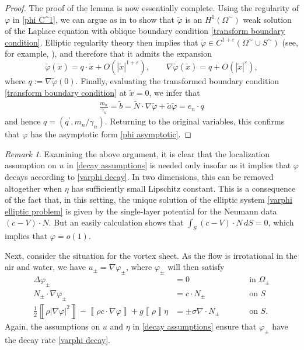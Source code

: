 \documentclass[11pt,reqno]{amsart}
\newcommand{\jump}[1]{\left\llbracket{#1}\right\rrbracket}
\newcommand{\grad}{\nabla}
\theoremstyle{plain}
\theoremstyle{remark}
\newtheorem{remark}[theorem]{Remark}
\numberwithin{equation}{section}
\begin{document}
\begin{proof}
The proof of the lemma is now essentially complete.  Using the regularity of $\varphi$ in \eqref{phi C^1}, we can argue as in \cite[Appendix A]{wheeler2016integral} to show that $\tilde \varphi$ is an $H^1(\Omega^\sim)$ weak solution of the Laplace equation with oblique boundary condition \eqref{transform boundary condition}.  Elliptic regularity theory then implies that $\tilde{\varphi} \in C^{1+\varepsilon}(\Omega^\sim \cup S^\sim)$ (see, for example, \cite[Theorem 5.51]{lieberman2013oblique}), and therefore that it admits the expansion 
\[ 
  \tilde \varphi(\tilde x) = q \cdot \tilde x + O(|\tilde x|^{1+\varepsilon}),
  \qquad 
  \nabla \tilde \varphi(\tilde x) = q + O(|\tilde x|^\varepsilon),
  \]
where $q := \nabla \tilde \varphi(0)$.  Finally, evaluating the transformed boundary condition \eqref{transform boundary condition} at $\tilde x = 0$, we infer that 
  \begin{align*}
    \frac{m_n}{\gamma_n}
    =
    \tilde b
    =
    \tilde N \cdot \grad \tilde\varphi  + \tilde a \tilde \varphi
    = e_n \cdot q
  \end{align*}
  and hence $q = (q^\prime, m_n/\gamma_n)$.  Returning to the original variables, this confirms that $\varphi$ has the asymptotic form \eqref{phi asymptotic}.
\end{proof}

\begin{remark} \label{decay of phi remark} Examining the above argument, it is clear that the localization assumption on $u$ in \eqref{decay assumptions} is needed only insofar as it implies that $\varphi$ decays according to \eqref{varphi decay}.  In two dimensions, this can be removed altogether when $\eta$ has sufficiently small Lipschitz constant.  This is a consequence of the fact that, in this setting, the unique solution of the elliptic system \eqref{varphi elliptic problem} is given by the single-layer potential for the Neumann data $(c-V) \cdot N$.
But an easily calculation shows that $\int_S (c-V) \cdot N\, dS = 0$, which implies that $\varphi=o(1)$. 
\end{remark}

Next, consider the situation for the vortex sheet.  As the flow is irrotational in the air and water, we have $u_\pm = \nabla \varphi_\pm$, where $\varphi_\pm$  will then satisfy
  \begin{subequations} \label{vortex sheet governing equations} 
\begin{alignat}{2}
 \Delta \varphi_\pm &= 0 && \qquad \textrm{in } \Omega_\pm  \label{vortex sheet varphi harmonic} \\
 N_\pm \cdot \nabla \varphi_\pm & = c \cdot N_\pm && \qquad \textrm{on } S \label{vortex sheet kinematic condition} \\
 \frac{1}{2} \jump{\rho | \nabla \varphi|^2} - \jump{\rho c \cdot \nabla \varphi} + g \jump{\rho} \eta & = \pm \sigma \nabla \cdot N_\pm && \qquad \textrm{on } S. \label{vortex sheet bernoulli condition} \end{alignat}
\end{subequations}  
Again, the assumptions on $u$ and $\eta$ in \eqref{decay assumptions} ensure that $\varphi_\pm$ have the decay rate \eqref{varphi decay}.   
\end{document}
